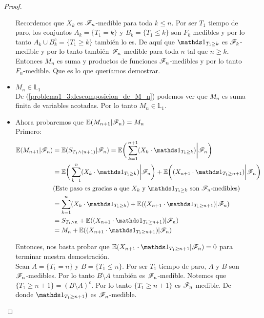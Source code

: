 \begin{proof}
\begin{itemize}
				Recordemos que $X_k$ es $\mathscr{F}_n$-medible para toda $k \leq n $. Por ser
				$T_1$ tiempo de paro, los conjuntos $A_k = \{T_1 = k\}$ y 
				$B_k = \{T_1 \leq k\}$	son $F_k$ medibles y por lo tanto 
				$A_k \cup B_k^c = \{ T_1 \geq k\}$ también lo es. De aquí que 
				$\indic_{T_1 \geq k}$ es $\mathscr{F}_k$-medible y por lo tanto también $\mathscr{F}_n$-medible
				para toda $n$ tal que $n \geq k$.\\
				  
				Entonces $M_n$ es suma y productos de funciones $\mathscr{F}_n$-medibles y por lo tanto
				$F_n$-medible. Que es lo que queríamos demostrar.\\
				
			\item
				$M_n \in \mathbb{L}_1$\\
				
				De (\ref{problema1_3:descomposicion_de_M_n}) podemos ver que $M_n$ es 
				suma finita de variables acotadas. Por lo tanto $M_n \in \mathbb{L}_1$.\\
				
			\item Ahora probaremos que	$\mathbb{E}(M_{n+1} | \mathscr{F}_{n}) = M_{n}$\\
				
				Primero:
				\begin{align}
					\E(M_{n+1} | \F_{n}) &= \E( S_{T_1 \wedge (n+1)} | \F_{n}) = 
					\E\bigg( \sum_{k=1}^{n+1} (X_k \cdot \indic_{T_1 \geq k})\bigg| \F_{n}\bigg) \\	 			
					& =\E\bigg( \sum_{k=1}^{n} (X_k \cdot \indic_{T_1 \geq k}) \bigg| \F_{n}\bigg) +
					\E\bigg((X_{n+1} \cdot \indic_{T_1 \geq n+1}) \bigg| \F_{n}\bigg) \\
					&\mbox{(Este paso es gracias a que $X_k$ y $\indic_{T_1 \geq k}$ son $\F_n$-medibles)}\\
					& = \sum_{k=1}^{n} (X_k \cdot \indic_{T_1 \geq k}) + 
					\E((X_{n+1} \cdot \indic_{T_1 \geq n+1}) | \F_{n}) \\
					& = S_{T_1 \wedge n} + \E((X_{n+1} \cdot \indic_{T_1 \geq n+1}) | \F_{n}) \\
					& = M_n + \E((X_{n+1} \cdot \indic_{T_1 \geq n+1}) | \F_{n})
				\end{align}
				
				Entonces, nos basta probar que $\E(X_{n+1} \cdot \indic_{T_1 \geq n+1} |
				 \F_{n}) = 0$ para terminar nuestra demostración.\\
				 
				Sean $A = \{T_1 = n\}$ y $B = \{ T_1 \leq n\}$. Por ser $T_1$ tiempo de paro,
				$A$ y $B$ son $\mathscr{F}_n$-medibles. Por lo tanto $B \setminus A$ también es $\mathscr{F}_n$-medible. 
				Notemos que $\{T_1 \geq n+1\} = (B \setminus A)^c$. Por lo tanto $\{T_1 \geq n+1\}$ es
				$\mathscr{F}_n$-medible. De donde  $\indic_{T_1 \geq n+1})$ es $\mathscr{F}_n$-medible.\\
				

\end{itemize}
\end{proof}
